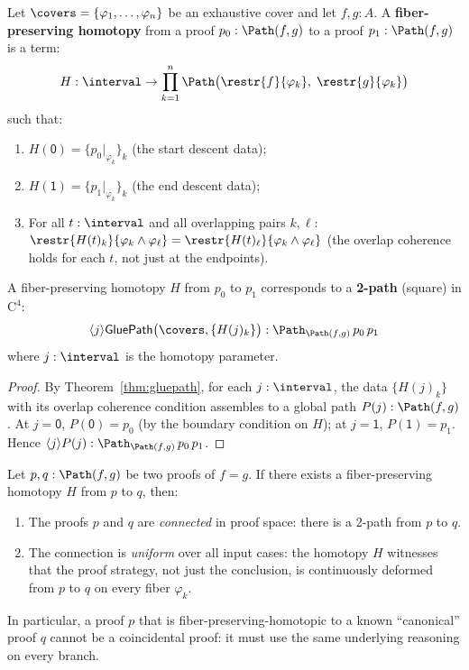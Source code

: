 \begin{definition}
\label{def:fiber-homotopy}
Let $\covers = \{\varphi_1, \ldots, \varphi_n\}$ be an exhaustive cover
and let $f, g : A$.  A \textbf{fiber-preserving homotopy} from a proof
$p_0 : \Path(f, g)$ to a proof $p_1 : \Path(f, g)$ is a term:
\[
  H : \interval \to
  \prod_{k=1}^n \Path\bigl(\restr{f}{\varphi_k},\;\restr{g}{\varphi_k}\bigr)
\]
such that:
\begin{enumerate}
\item $H(\mathsf{0}) = \{p_0|_{\varphi_k}\}_k$ (the start descent data);
\item $H(\mathsf{1}) = \{p_1|_{\varphi_k}\}_k$ (the end descent data);
\item For all $t : \interval$ and all overlapping pairs $k, \ell$:
  $\restr{H(t)_k}{\varphi_k \wedge \varphi_\ell}
  = \restr{H(t)_\ell}{\varphi_k \wedge \varphi_\ell}$
  (the overlap coherence holds for each $t$, not just at the endpoints).
\end{enumerate}
\end{definition}

\begin{proposition}
\label{prop:fiber-homotopy-2path}
A fiber-preserving homotopy $H$ from $p_0$ to $p_1$ corresponds
to a \textbf{2-path} (square) in $\mathrm{C}^4$:
\[
  \langle j \rangle \mathsf{GluePath}\bigl(\covers, \{H(j)_k\}\bigr)
  : \Path_{\Path(f,g)}\, p_0\, p_1
\]
where $j : \interval$ is the homotopy parameter.
\end{proposition}

\begin{proof}
By Theorem~\ref{thm:gluepath}, for each $j : \interval$, the data
$\{H(j)_k\}$ with its overlap coherence condition assembles to a global
path $P(j) : \Path(f, g)$.  At $j = \mathsf{0}$, $P(\mathsf{0}) = p_0$
(by the boundary condition on $H$); at $j = \mathsf{1}$,
$P(\mathsf{1}) = p_1$.  Hence $\langle j \rangle P(j) :
\Path_{\Path(f,g)}\, p_0\, p_1$.
\end{proof}

\begin{theorem}
\label{thm:homotopy-rules-out-accidental}
Let $p, q : \Path(f, g)$ be two proofs of $f = g$.  If there exists a
fiber-preserving homotopy $H$ from $p$ to $q$, then:
\begin{enumerate}
\item The proofs $p$ and $q$ are \emph{connected} in proof space:
  there is a 2-path from $p$ to $q$.
\item The connection is \emph{uniform} over all input cases: the
  homotopy $H$ witnesses that the proof strategy, not just the conclusion,
  is continuously deformed from $p$ to $q$ on every fiber $\varphi_k$.
\end{enumerate}
In particular, a proof $p$ that is fiber-preserving-homotopic to a known
``canonical'' proof $q$ cannot be a coincidental proof: it must use the
same underlying reasoning on every branch.
\end{theorem}

